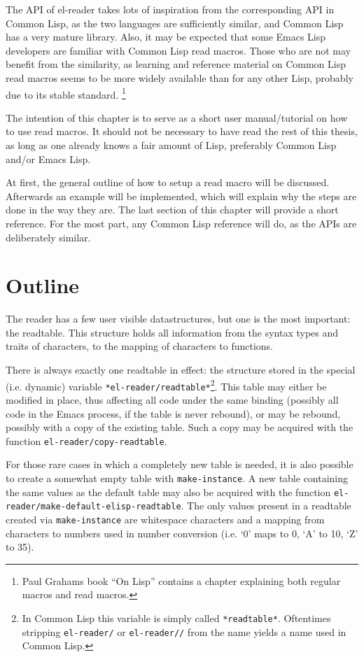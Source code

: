 \documentclass[a4paper,10pt,twoside]{report}
\newcommand{\el}{Emacs Lisp}
\newcommand{\cl}{Common Lisp}
\newcommand{\elr}{el-reader}
\newcommand{\sym}[1]{\texttt{#1}}
\newcommand{\fun}[1]{\texttt{#1}}
\begin{document}
The API of \elr{} takes lots of inspiration from the corresponding API in
\cl{}, as the two languages are sufficiently similar, and \cl{} has a very
mature library.  Also, it may be expected that some \el{} developers are
familiar with \cl{} read macros.  Those who are not may benefit from the
similarity, as learning and reference material on \cl{} read macros seems to be
more widely available than for any other Lisp, probably due to its stable
standard.  \footnote{Paul Grahams book ``On Lisp''\cite[p.~224]{on-lisp}
  contains a chapter explaining both regular macros and read macros.}

The intention of this chapter is to serve as a short user manual/tutorial on how
to use read macros.  It should not be necessary to have read the rest of this
thesis, as long as one already knows a fair amount of Lisp, preferably \cl{}
and/or \el{}.

At first, the general outline of how to setup a read macro will be discussed.
Afterwards an example will be implemented, which will explain why the steps are
done in the way they are.  The last section of this chapter will provide a short
reference.  For the most part, any \cl{} reference will do, as the APIs are
deliberately similar.

\section{Outline}
\label{sec:outline}

The reader has a few user visible datastructures, but one is the most important:
the readtable.  This structure holds all information from the syntax types and
traits of characters, to the mapping of characters to functions.

There is always exactly one readtable in effect: the structure stored in the
special (i.e. dynamic) variable \sym{*el-reader/readtable*}\footnote{In \cl{}
  this variable is simply called \sym{*readtable*}.  Oftentimes stripping
  \sym{el-reader/} or \sym{el-reader//} from the name yields a name used in
  \cl{}.}.  This table may either be modified in place, thus affecting all code
under the same binding (possibly all code in the Emacs process, if the table is
never rebound), or may be rebound, possibly with a copy of the existing table.
Such a copy may be acquired with the function \fun{el-reader/copy-readtable}.

For those rare cases in which a completely new table is needed, it is also
possible to create a somewhat empty table with \fun{make-instance}.  A new table
containing the same values as the default table may also be acquired with the
function \fun{el-reader/make-default-elisp-readtable}.  The only values present
in a readtable created via \fun{make-instance} are whitespace characters and a
mapping from characters to numbers used in number conversion (i.e. `0' maps to
0, `A' to 10, `Z' to 35).
\end{document}
